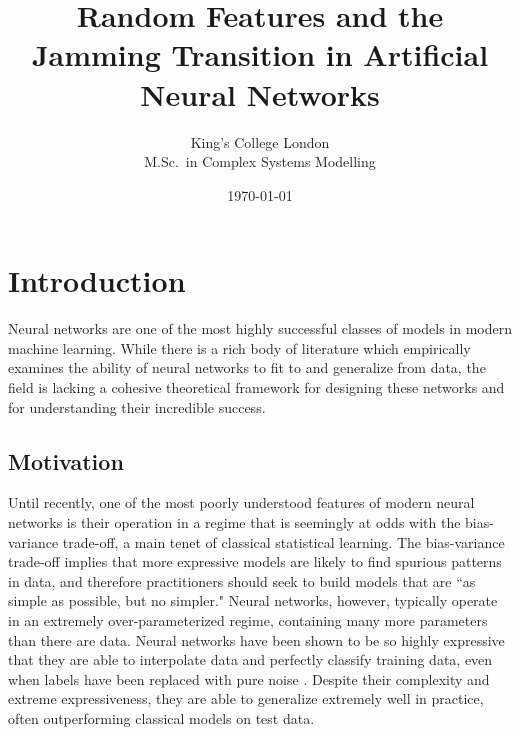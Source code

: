 \documentclass[a4paper, 12pt]{article}
\begin{document}
\title{\bf Random Features and the Jamming Transition in Artificial Neural Networks}
\author{
    King's College London\\
    M.Sc.\ in Complex Systems Modelling
}
\date{\today}

\begin{titlingpage}
\maketitle
\begin{abstract}
\lipsum[1]
\end{abstract}
\end{titlingpage}

\section{Introduction}
Neural networks are one of the most highly successful classes of models in modern machine learning. While there is a rich body of literature which empirically examines the ability of neural networks to fit to and generalize from data, the field is lacking a cohesive theoretical framework for designing these networks and for understanding their incredible success. \\

\subsection{Motivation}

Until recently, one of the most poorly understood features of modern neural networks is their operation in a regime that is seemingly at odds with the bias-variance trade-off, a main tenet of classical statistical learning. The bias-variance trade-off implies that more expressive models are likely to find spurious patterns in data, and therefore practitioners should seek to build models that are ``as simple as possible, but no simpler." Neural networks, however, typically operate in an extremely over-parameterized regime, containing many more parameters than there are data. Neural networks have been shown to be so highly expressive that they are able to interpolate data and perfectly classify training data, even when labels have been replaced with pure noise \cite{zhangUnderstandingDeepLearning2017}. Despite their complexity and extreme expressiveness, they are able to generalize extremely well in practice, often outperforming classical models on test data. \\
\end{document}
